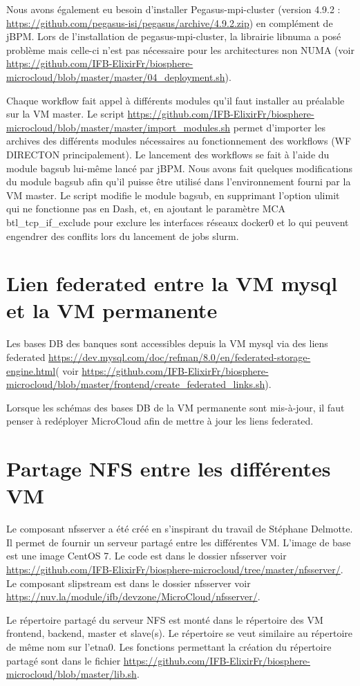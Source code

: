 Nous avons également eu besoin d'installer Pegasus-mpi-cluster (version 4.9.2 : \url{https://github.com/pegasus-isi/pegasus/archive/4.9.2.zip}) en complément de jBPM. Lors de l'installation de pegasus-mpi-cluster, la librairie libnuma a posé problème mais celle-ci n'est pas nécessaire pour les architectures non NUMA (voir \url{https://github.com/IFB-ElixirFr/biosphere-microcloud/blob/master/master/04_deployment.sh}).

\bigskip
Chaque workflow fait appel à différents modules qu'il faut installer au préalable sur la VM master. Le script \url{https://github.com/IFB-ElixirFr/biosphere-microcloud/blob/master/master/import_modules.sh} permet d'importer les archives des différents modules nécessaires au fonctionnement des workflows (WF DIRECTON principalement).
Le lancement des workflows se fait à l'aide du module bagsub lui-même lancé par jBPM. Nous avons fait quelques modifications du module bagsub afin qu'il puisse être utilisé dans l'environnement fourni par la VM master. Le script  modifie le module bagsub, en supprimant l'option ulimit qui ne fonctionne pas en Dash, et, en ajoutant le paramètre MCA btl\_tcp\_if\_exclude pour exclure les interfaces réseaux docker0 et lo qui peuvent engendrer des conflits lors du lancement de jobs slurm.


\section{Lien federated entre la VM mysql et  la VM permanente}
Les bases DB des banques sont accessibles depuis la VM mysql via des liens federated \url{https://dev.mysql.com/doc/refman/8.0/en/federated-storage-engine.html}( 
voir \url{https://github.com/IFB-ElixirFr/biosphere-microcloud/blob/master/frontend/create_federated_links.sh}).
\bigskip

\begin{mycolorbox}
	Lorsque les schémas des bases DB de la VM permanente sont mis-à-jour, il faut penser à redéployer MicroCloud afin de mettre à jour les liens federated.
\end{mycolorbox}

\section{Partage NFS entre les différentes VM}

\label{nfsserver} Le composant nfsserver a été créé en s'inspirant du travail de Stéphane Delmotte.
Il permet de fournir un serveur partagé entre les différentes VM.
L'image de base est une image CentOS 7.
Le code est dans le dossier nfsserver voir  \url{https://github.com/IFB-ElixirFr/biosphere-microcloud/tree/master/nfsserver/}.
Le composant slipstream est dans le dossier nfsserver voir
\url{https://nuv.la/module/ifb/devzone/MicroCloud/nfsserver/}.

Le répertoire partagé  du serveur NFS est monté dans le répertoire 
des VM frontend, backend, master et slave(s).
Le répertoire  se veut similaire au répertoire de même nom sur l’etna0. 
Les fonctions permettant la création du répertoire partagé sont dans le fichier \url{https://github.com/IFB-ElixirFr/biosphere-microcloud/blob/master/lib.sh}.

